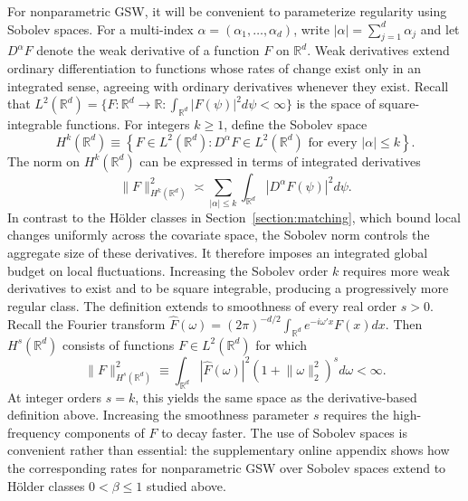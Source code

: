 \documentclass[letterpaper,12pt]{article}
\theoremstyle{definition}
\numberwithin{equation}{section}
\newcommand{\mr}{\mathbb{R}}
\newcommand{\norm}[1]{\lVert#1\rVert}
\begin{document}
For nonparametric GSW, it will be convenient to parameterize regularity using Sobolev spaces.
For a multi-index $\alpha=(\alpha_1,\ldots,\alpha_d)$, write $|\alpha|=\sum_{j=1}^d\alpha_j$ and let $D^\alpha F$ denote the weak derivative of a function $F$ on $\mr^d$.
Weak derivatives extend ordinary differentiation to functions whose rates of change exist only in an integrated sense, agreeing with ordinary derivatives whenever they exist.
Recall that $L^2(\mr^d)=\{F:\mr^d\to\mr:\int_{\mr^d}|F(\psi)|^2d\psi<\infty\}$ is the space of square-integrable functions.
For integers $k\geq1$, define the Sobolev space
\begin{equation}\label{equation:sobolev-whole-space}
H^k(\mr^d) \equiv \left\{ F\in L^2(\mr^d): D^\alpha F\in L^2(\mr^d) \text{ for every }|\alpha|\leq k \right\}.
\end{equation}
The norm on $H^k(\mr^d)$ can be expressed in terms of integrated derivatives 
\begin{equation}\label{equation:sobolev-whole-space-norm}
\norm{F}_{H^k(\mr^d)}^2 \asymp \sum_{|\alpha|\leq k} \int_{\mr^d}|D^\alpha F(\psi)|^2d\psi.
\end{equation}
In contrast to the H\"older classes in Section~\ref{section:matching}, which bound local changes uniformly across the covariate space, the Sobolev norm controls the aggregate size of these derivatives.
It therefore imposes an integrated global budget on local fluctuations.
Increasing the Sobolev order $k$ requires more weak derivatives to exist and to be square integrable, producing a progressively more regular class.
The definition extends to smoothness of every real order $s>0$.
Recall the Fourier transform $\widehat F(\omega)=(2\pi)^{-d/2}\int_{\mr^d}e^{-i\omega'x}F(x)dx$.
Then $H^s(\mr^d)$ consists of functions $F\in L^2(\mr^d)$ for which
\begin{equation}\label{equation:sobolev-spectral-norm}
\norm{F}_{H^s(\mr^d)}^2 \equiv \int_{\mr^d}|\widehat F(\omega)|^2(1+\norm{\omega}_2^2)^sd\omega<\infty.
\end{equation}
At integer orders $s=k$, this yields the same space as the derivative-based definition above.
Increasing the smoothness parameter $s$ requires the high-frequency components of $F$ to decay faster.
The use of Sobolev spaces is convenient rather than essential: the supplementary online appendix shows how the corresponding rates for nonparametric GSW over Sobolev spaces extend to H\"older classes $0<\beta\leq1$ studied above.

\medskip
\end{document}
